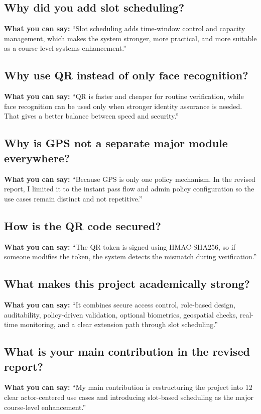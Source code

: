 \documentclass[12pt,letterpaper]{article}
\newcommand{\say}[1]{\textbf{What you can say:} ``#1''}
\begin{document}
\subsection{Why did you add slot scheduling?}
\say{Slot scheduling adds time-window control and capacity management, which makes the system stronger, more practical, and more suitable as a course-level systems enhancement.}

\subsection{Why use QR instead of only face recognition?}
\say{QR is faster and cheaper for routine verification, while face recognition can be used only when stronger identity assurance is needed. That gives a better balance between speed and security.}

\subsection{Why is GPS not a separate major module everywhere?}
\say{Because GPS is only one policy mechanism. In the revised report, I limited it to the instant pass flow and admin policy configuration so the use cases remain distinct and not repetitive.}

\subsection{How is the QR code secured?}
\say{The QR token is signed using HMAC-SHA256, so if someone modifies the token, the system detects the mismatch during verification.}

\subsection{What makes this project academically strong?}
\say{It combines secure access control, role-based design, auditability, policy-driven validation, optional biometrics, geospatial checks, real-time monitoring, and a clear extension path through slot scheduling.}

\subsection{What is your main contribution in the revised report?}
\say{My main contribution is restructuring the project into 12 clear actor-centered use cases and introducing slot-based scheduling as the major course-level enhancement.}
\end{document}
